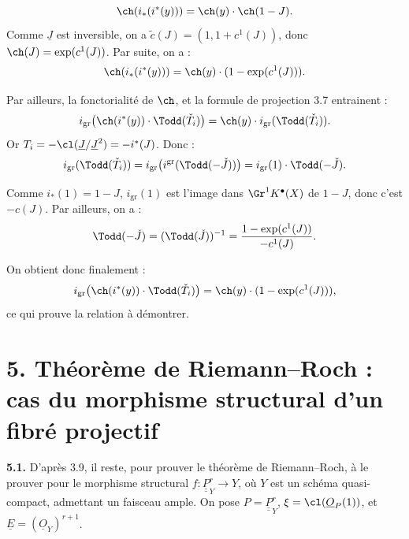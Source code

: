 
\[
 \ch(i_*(i^*(y)))=\ch(y)\cdot\ch(1-J).
\]
Comme \(\underline{J}\) est inversible, on a \(\widetilde c(J)=(1,1+c^1(J))\), donc \(\ch(J)=\exp(c^1(J))\).
Par suite, on a :
\[
 \ch(i_*(i^*(y)))=\ch(y)\cdot(1-\exp(c^1(J))).
\]

Par ailleurs, la fonctorialité de \(\ch\), et la formule de projection 3.7 entrainent :
\[
 i_{\mathrm{gr}}\bigl(\ch(i^*(y))\cdot\Todd(\check T_i)\bigr)
 =
 \ch(y)\cdot i_{\mathrm{gr}}(\Todd(\check T_i)).
\]
Or \(T_i=-\cl(\underline{J}/\underline{J}^2)=-i^*(J)\). Donc :
\[
 i_{\mathrm{gr}}(\Todd(\check T_i))
 =
 i_{\mathrm{gr}}\bigl(i^{\mathrm{gr}}(\Todd(-\check J))\bigr)
 =
 i_{\mathrm{gr}}(1)\cdot\Todd(-\check J).
\]

Comme \(i_*(1)=1-J\), \(i_{\mathrm{gr}}(1)\) est l'image dans \(\Gr^1K^{\bullet}(X)\) de \(1-J\), donc c'est \(-c(J)\). Par ailleurs, on a :
\[
 \Todd(-\check J)=(\Todd(\check J))^{-1}
 =
 \frac{1-\exp(c^1(J))}{-c^1(J)}.
\]

On obtient donc finalement :
\[
 i_{\mathrm{gr}}\bigl(\ch(i^*(y))\cdot\Todd(\check T_i)\bigr)
 =
 \ch(y)\cdot(1-\exp(c^1(J))),
\]
ce qui prouve la relation à démontrer.

\section*{5. Théorème de Riemann--Roch : cas du morphisme structural d'un fibré projectif}

\textbf{5.1.} D'après 3.9, il reste, pour prouver le théorème de Riemann--Roch, à le prouver pour le morphisme structural \(f:\underline{\underline{P}}^r_Y\longrightarrow Y\), où \(Y\) est un schéma quasi-compact, admettant un faisceau ample. On pose \(P=\underline{\underline{P}}^r_Y\), \(\xi=\cl(\underline{O}_P(1))\), et \(\underline{E}=(\underline{O}_Y)^{r+1}\).

